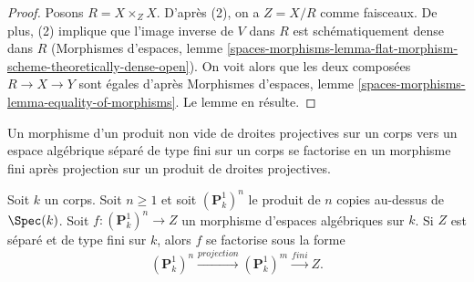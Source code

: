 \begin{proof}
Posons $R = X \times_Z X$. D'après (2), on a $Z = X/R$ comme faisceaux.
De plus, (2) implique que l'image inverse de $V$ dans $R$ est
schématiquement dense dans $R$ (Morphismes d'espaces, lemme
\ref{spaces-morphisms-lemma-flat-morphism-scheme-theoretically-dense-open}).
On voit alors que les deux composées
$R \to X \to Y$ sont égales d'après Morphismes d'espaces, lemme
\ref{spaces-morphisms-lemma-equality-of-morphisms}.
Le lemme en résulte.
\end{proof}

\begin{lemma}
\label{lemma-quotient-power-P1}
\begin{slogan}
Un morphisme d'un produit non vide de droites projectives sur un corps vers
un espace algébrique séparé de type fini sur un corps se factorise en un
morphisme fini après projection sur un produit de droites projectives.
\end{slogan}
Soit $k$ un corps. Soit $n \geq 1$ et soit $(\mathbf{P}^1_k)^n$
le produit de $n$ copies au-dessus de $\Spec(k)$. Soit
$f : (\mathbf{P}^1_k)^n \to Z$ un morphisme d'espaces algébriques sur $k$.
Si $Z$ est séparé et de type fini sur $k$, alors $f$ se factorise sous la forme
$$
(\mathbf{P}^1_k)^n \xrightarrow{projection}
(\mathbf{P}^1_k)^m \xrightarrow{fini} Z.
$$
\end{lemma}

